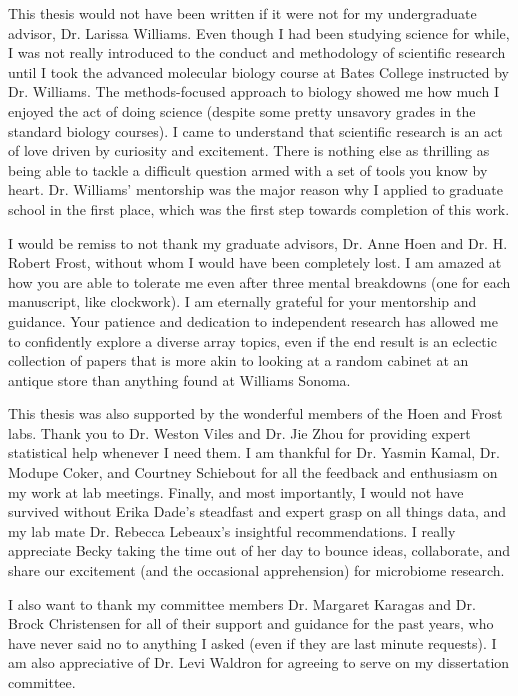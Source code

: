 \documentclass{dcthesis}
\theoremstyle{definition}
\theoremstyle{remark}
\begin{document}
This thesis would not have been written if it were not for my undergraduate advisor, Dr. Larissa Williams. Even though I had been studying science for while, I was not really introduced to the conduct and methodology of scientific research until I took the advanced molecular biology course at Bates College instructed by Dr. Williams. The methods-focused approach to biology showed me how much I enjoyed the act of doing science (despite some pretty unsavory grades in the standard biology courses). I came to understand that scientific research is an act of love driven by curiosity and excitement. There is nothing else as thrilling as being able to tackle a difficult question armed with a set of tools you know by heart. Dr. Williams' mentorship was the major reason why I applied to graduate school in the first place, which was the first step towards completion of this work.  

I would be remiss to not thank my graduate advisors, Dr. Anne Hoen and Dr. H. Robert Frost, without whom I would have been completely lost. I am amazed at how you are able to tolerate me even after three mental breakdowns (one for each manuscript, like clockwork). I am eternally grateful for your mentorship and guidance. Your patience and dedication to independent research has allowed me to confidently explore a diverse array topics, even if the end result is an eclectic collection of papers that is more akin to looking at a random cabinet at an antique store than anything found at Williams Sonoma. 

This thesis was also supported by the wonderful members of the Hoen and Frost labs. Thank you to Dr. Weston Viles and Dr. Jie Zhou for providing expert statistical help whenever I need them. I am thankful for Dr. Yasmin Kamal, Dr. Modupe Coker, and Courtney Schiebout for all the feedback and enthusiasm on my work at lab meetings. Finally, and most importantly, I would not have survived without Erika Dade's steadfast and expert grasp on all things data, and my lab mate Dr. Rebecca Lebeaux's insightful recommendations. I really appreciate Becky taking the time out of her day to bounce ideas, collaborate, and share our excitement (and the occasional apprehension) for microbiome research. 

I also want to thank my committee members Dr. Margaret Karagas and Dr. Brock Christensen for all of their support and guidance for the past years, who have never said no to anything I asked (even if they are last minute requests). I am also appreciative of Dr. Levi Waldron for agreeing to serve on my dissertation committee.   
\end{document}
